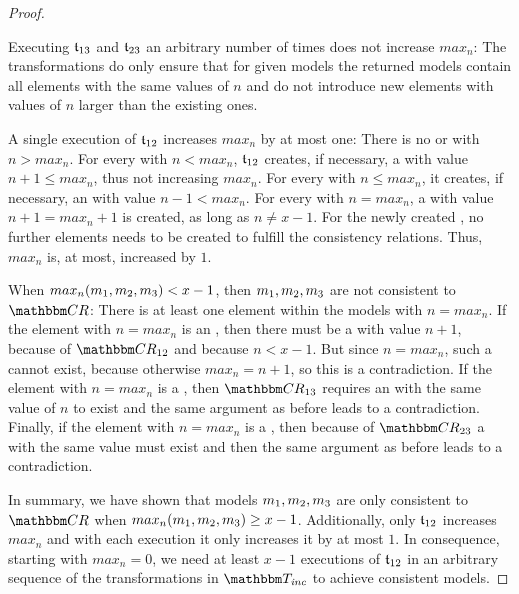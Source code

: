 \begin{proof}
    \begin{properdescription}
        \item[Executing $\mathfrak{t}_{13}$ and $\mathfrak{t}_{23}$ an arbitrary number of times does not increase $max_n$:]
        The transformations do only ensure that for given models the returned models contain all elements with the same values of $n$ and do not introduce new elements with values of $n$ larger than the existing ones.
        \item[A single execution of $\mathfrak{t}_{12}$ increases $max_n$ by at most one:]
        There is no  or  with $n > max_n$.
        For every  with $n < max_n$, $\mathfrak{t}_{12}$ creates, if necessary, a  with value $n + 1 \leq max_n$, thus not increasing $max_n$.
        For every  with $n \leq max_n$, it creates, if necessary, an  with value $n-1 < max_n$.
        For every  with $n = max_n$, a  with value $n+1 = max_n + 1$ is created, as long as $n \neq x-1$.
        For the newly created , no further elements needs to be created to fulfill the consistency relations.
        Thus, $max_n$ is, at most, increased by $1$.
        \item[ When $max_n(m_{1},m_{2},m_{3}) < x-1$, then $m_{1},m_{2},m_{3}$ are not consistent to $\consistencyrelationset{CR}$:]
        There is at least one element within the models with $n = max_n$.
        If the element with $n = max_n$ is an , then there must be a  with value $n+1$, because of $\consistencyrelationset{CR}_{12}$ and because $n < x-1$.
        But since $n = max_n$, such a  cannot exist, because otherwise $max_n = n+1$, so this is a contradiction.    
        If the element with $n = max_n$ is a , then $\consistencyrelationset{CR}_{13}$ requires an  with the same value of $n$ to exist and the same argument as before leads to a contradiction.
        Finally, if the element with $n = max_n$ is a , then because of $\consistencyrelationset{CR}_{23}$ a  with the same value must exist and then the same argument as before leads to a contradiction.
    \end{properdescription}

    In summary, we have shown that models $m_{1},m_{2},m_{3}$ are only consistent to $\consistencyrelationset{CR}$ when $max_n(m_{1},m_{2},m_{3}) \geq x-1$.
    Additionally, only $\mathfrak{t}_{12}$ increases $max_n$ and with each execution it only increases it by at most $1$.
    In consequence, starting with $max_n = 0$, we need at least $x-1$ executions of $\mathfrak{t}_{12}$ in an arbitrary sequence of the transformations in $\transformationset{T}_\mathvariable{inc}$ to achieve consistent models.
\end{proof}

